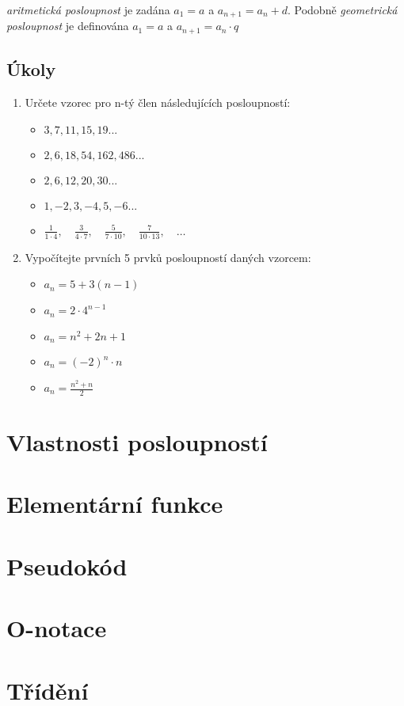 \documentclass[12pt,a4paper]{book}
\begin{document}
\begin{definition}
	\emph{aritmetická posloupnost} je zadána $a_1 = a$ a $a_{n+1} = a_n + d$.
	Podobně \emph{geometrická posloupnost} je definována $a_1 = a$ a $a_{n + 1} = a_n \cdot q$
\end{definition}
		
\section{Úkoly}
\begin{enumerate}
	\item Určete vzorec pro n-tý člen následujících posloupností:
		\begin{itemize}
			\item $ 3, 7, 11, 15, 19 ...$
			\item $ 2, 6, 18, 54, 162, 486 ...$
			\item $ 2, 6, 12,20, 30 ... $
			\item $ 1, -2, 3, -4, 5, -6 ...$
			\item $
\frac{1}{1 \cdot 4}, \quad \frac{3}{4 \cdot 7}, \quad \frac{5}{7 \cdot 10}, \quad \frac{7}{10 \cdot 13}, \quad \dots$
		\end{itemize}
	\item Vypočítejte prvních 5 prvků posloupností daných vzorcem:
		\begin{itemize}
			 \item $ a_n = 5 + 3(n - 1)$
			 \item $ a_n = 2 \cdot 4^{n - 1}$
			 \item $ a_n = n^2 + 2n + 1$
			 \item $ a_n = (-2)^n \cdot n$
			 \item $a_n = \frac{n^2 + n}{2}$
		\end{itemize}
\end{enumerate}


	
	
\chapter{Vlastnosti posloupností}

\chapter{Elementární funkce}

\chapter{Pseudokód}

\chapter{O-notace}

\chapter{Třídění}
\end{document}
